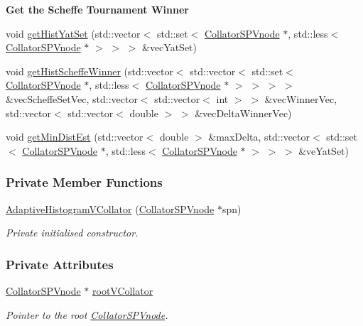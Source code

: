 \begin{Indent}{\bf \-Get the \-Scheffe \-Tournament \-Winner}
\begin{DoxyCompactItemize}
\item 
void \hyperlink{classsubpavings_1_1AdaptiveHistogramVCollator_a596a34b5f83f532160c5ab9104d6aa00}{get\-Hist\-Yat\-Set} (std\-::vector$<$ std\-::set$<$ \hyperlink{classsubpavings_1_1CollatorSPVnode}{\-Collator\-S\-P\-Vnode} $\ast$, std\-::less$<$ \hyperlink{classsubpavings_1_1CollatorSPVnode}{\-Collator\-S\-P\-Vnode} $\ast$ $>$ $>$ $>$ \&vec\-Yat\-Set)
\item 
void \hyperlink{classsubpavings_1_1AdaptiveHistogramVCollator_a1ea3cb0ee5fea756fc45445fec2db166}{get\-Hist\-Scheffe\-Winner} (std\-::vector$<$ std\-::vector$<$ std\-::set$<$ \hyperlink{classsubpavings_1_1CollatorSPVnode}{\-Collator\-S\-P\-Vnode} $\ast$, std\-::less$<$ \hyperlink{classsubpavings_1_1CollatorSPVnode}{\-Collator\-S\-P\-Vnode} $\ast$ $>$ $>$ $>$ $>$ \&vec\-Scheffe\-Set\-Vec, std\-::vector$<$ std\-::vector$<$ int $>$ $>$ \&vec\-Winner\-Vec, std\-::vector$<$ std\-::vector$<$ double $>$ $>$ \&vec\-Delta\-Winner\-Vec)
\item 
void \hyperlink{classsubpavings_1_1AdaptiveHistogramVCollator_a130f3418c9610b38030221924a846011}{get\-Min\-Dist\-Est} (std\-::vector$<$ double $>$ \&max\-Delta, std\-::vector$<$ std\-::set$<$ \hyperlink{classsubpavings_1_1CollatorSPVnode}{\-Collator\-S\-P\-Vnode} $\ast$, std\-::less$<$ \hyperlink{classsubpavings_1_1CollatorSPVnode}{\-Collator\-S\-P\-Vnode} $\ast$ $>$ $>$ $>$ \&ve\-Yat\-Set)
\end{DoxyCompactItemize}
\end{Indent}
\subsubsection*{\-Private \-Member \-Functions}
\begin{DoxyCompactItemize}
\item 
\hyperlink{classsubpavings_1_1AdaptiveHistogramVCollator_a1c28c75c070df4a922a066092cd7427e}{\-Adaptive\-Histogram\-V\-Collator} (\hyperlink{classsubpavings_1_1CollatorSPVnode}{\-Collator\-S\-P\-Vnode} $\ast$spn)
\begin{DoxyCompactList}\small\item\em \-Private initialised constructor. \end{DoxyCompactList}\end{DoxyCompactItemize}
\subsubsection*{\-Private \-Attributes}
\begin{DoxyCompactItemize}
\item 
\hyperlink{classsubpavings_1_1CollatorSPVnode}{\-Collator\-S\-P\-Vnode} $\ast$ \hyperlink{classsubpavings_1_1AdaptiveHistogramVCollator_aceeaa0eac30ad826088e670544e1fcac}{root\-V\-Collator}
\begin{DoxyCompactList}\small\item\em \-Pointer to the root \hyperlink{classsubpavings_1_1CollatorSPVnode}{\-Collator\-S\-P\-Vnode}. \end{DoxyCompactList}\end{DoxyCompactItemize}


